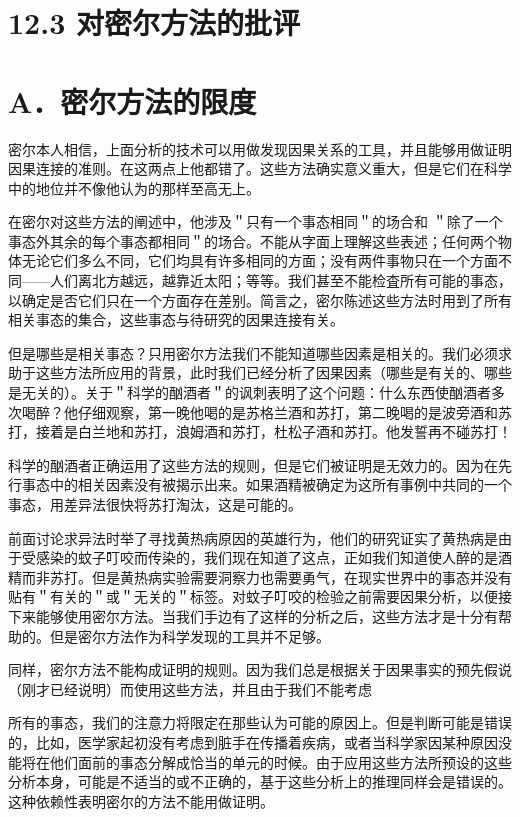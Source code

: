 \section*{12.3 对密尔方法的批评}
\section*{A．密尔方法的限度}
密尔本人相信，上面分析的技术可以用做发现因果关系的工具，并且能够用做证明因果连接的准则。在这两点上他都错了。这些方法确实意义重大，但是它们在科学中的地位并不像他认为的那样至高无上。

在密尔对这些方法的阐述中，他涉及＂只有一个事态相同＂的场合和 ＂除了一个事态外其余的每个事态都相同＂的场合。不能从字面上理解这些表述；任何两个物体无论它们多么不同，它们均具有许多相同的方面；没有两件事物只在一个方面不同——人们离北方越远，越靠近太阳；等等。我们甚至不能检査所有可能的事态，以确定是否它们只在一个方面存在差别。简言之，密尔陈述这些方法时用到了所有相关事态的集合，这些事态与待研究的因果连接有关。

但是哪些是相关事态？只用密尔方法我们不能知道哪些因素是相关的。我们必须求助于这些方法所应用的背景，此时我们已经分析了因果因素（哪些是有关的、哪些是无关的）。关于＂科学的酗酒者＂的讽刺表明了这个问题：什么东西使酗酒者多次喝醉？他仔细观察，第一晚他喝的是苏格兰酒和苏打，第二晚喝的是波旁酒和苏打，接着是白兰地和苏打，浪姆酒和苏打，杜松子酒和苏打。他发誓再不碰苏打！

科学的酗酒者正确运用了这些方法的规则，但是它们被证明是无效力的。因为在先行事态中的相关因素没有被揭示出来。如果酒精被确定为这所有事例中共同的一个事态，用差异法很快将苏打淘汰，这是可能的。

前面讨论求异法时举了寻找黄热病原因的英雄行为，他们的研究证实了黄热病是由于受感染的蚊子叮咬而传染的，我们现在知道了这点，正如我们知道使人醉的是酒精而非苏打。但是黄热病实验需要洞察力也需要勇气，在现实世界中的事态并没有贴有＂有关的＂或＂无关的＂标签。对蚊子叮咬的检验之前需要因果分析，以便接下来能够使用密尔方法。当我们手边有了这样的分析之后，这些方法才是十分有帮助的。但是密尔方法作为科学发现的工具并不足够。

同样，密尔方法不能构成证明的规则。因为我们总是根据关于因果事实的预先假说（刚才已经说明）而使用这些方法，并且由于我们不能考虑

所有的事态，我们的注意力将限定在那些认为可能的原因上。但是判断可能是错误的，比如，医学家起初没有考虑到脏手在传播着疾病，或者当科学家因某种原因没能将在他们面前的事态分解成恰当的单元的时候。由于应用这些方法所预设的这些分析本身，可能是不适当的或不正确的，基于这些分析上的推理同样会是错误的。这种依赖性表明密尔的方法不能用做证明。

